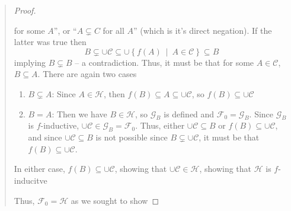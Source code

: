 \documentclass[oneside]{book}
\newcommand{\CC}{\mathcal{C}}
\newcommand{\CG}{\mathcal{G}}
\newcommand{\CH}{\mathcal{H}}
\newcommand{\ff}{\mathscr{F}}
\newcommand{\sse}{\subseteq}
\newcommand{\ssne}{\subsetneq}
\newcommand{\set}[2]{\left\{#1 \ \middle|\ #2\right\}}
\begin{document}
\begin{Proof}
\begin{quote}
\begin{enumerate}
\begin{proof}
\begin{enumerate}
							for some $A$'', or ``$A \ssne C$ for all $A$'' (which is it's direct negation). If the
							latter was true then
							\[
								B \ssne \cup \CC \sse \cup \set{f(A)}{A \in \CC} \sse B
							\]
							implying $B\ssne B$ -- a contradiction. Thus, it must be that for some $A \in \CC$, $B \sse
							A$. There are again two cases
							\begin{enumerate}
								\item $B \ssne A$: Since $A \in \CH$, then $f(B) \sse A \sse \cup \CC$, so $f(B) \sse
									\cup \CC$
								\item $B = A$: Then we have $B \in \CH$, so $\CG_B$ is defined and $\ff_0 = \CG_B$.
									Since $\CG_B$ is $f$-inductive, $\cup \CC \in \CG_B = \ff_0$.  Thus, either $\cup \CC
									\sse B$ or $f(B) \sse \cup \CC$, and since $\cup\CC \sse B$ is not possible since $B
									\ssne \cup \CC$, it must be that $f(B) \sse \cup\CC$.
							\end{enumerate}
							In either case, $f(B) \sse \cup\CC$, showing that $\cup\CC \in \CH$, showing that $\CH$ is
							$f$-inducitve
					\end{enumerate}
					Thus, $\ff_0 = \CH$ as we sought to show
				\end{proof}


\end{enumerate}
\end{quote}
\end{Proof}
\end{document}
